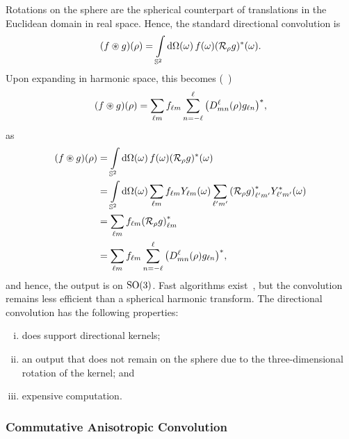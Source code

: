 Rotations on the sphere are the spherical counterpart of translations in the Euclidean domain in real space.
Hence, the standard directional convolution is
%
\begin{equation}\label{eq:chapter3_directional_convolution}
    (f \circledast g)(\rho)
    = \integrateSphere{\omega} \pixel{f} \pixel{\conj{(\rotation{\rho}g)}}.
\end{equation}
%
Upon expanding in harmonic space, this becomes (\eg{}~\cite{McEwen2007,Wandelt2001})
%
\begin{equation}
    (f \circledast g) (\rho)
    = \harmonicSum \harmonic{f} \wignerSum \conj{\big(\wigner{\ell}{m}{n}(\rho) g_{\ell n}\big)},
\end{equation}
%
as
%
\begin{align}
    (f \circledast g)(\rho)
     & = \integrateSphere{\omega} \pixel{f} \pixel{\conj{(\rotation{\rho}g)}} \nonumber{}                                                                                           \\
     & = \integrateSphere{\omega} \harmonicSum \harmonic{f} \pixel{\harmonic{Y}} \harmonicSum['] \conj{\harmonic[']{(\rotation{\rho}g)}} \pixel{\conj{\harmonic[']{Y}}} \nonumber{} \\
     & = \harmonicSum \harmonic{f} \conj{\harmonic{(\rotation{\rho}g)}} \nonumber{}                                                                                                 \\
     & = \harmonicSum \harmonic{f} \wignerSum \conj{\big(\wigner{\ell}{m}{n}(\rho) g_{\ell n}\big)},
\end{align}
%
and hence, the output is on \(\rotationGroup{}\).
Fast algorithms exist~\cite{McEwen2007,Wandelt2001,Wiaux2007,McEwen2013}, but the convolution remains less efficient than a spherical harmonic transform.
The directional convolution has the following properties:
%
\begin{enumerate}[(i),nosep,left=\parindent]
    \item does support directional kernels;
    \item an output that does not remain on the sphere due to the three-dimensional rotation of the kernel; and
    \item expensive computation.
\end{enumerate}

\subsubsection{Commutative Anisotropic Convolution}

